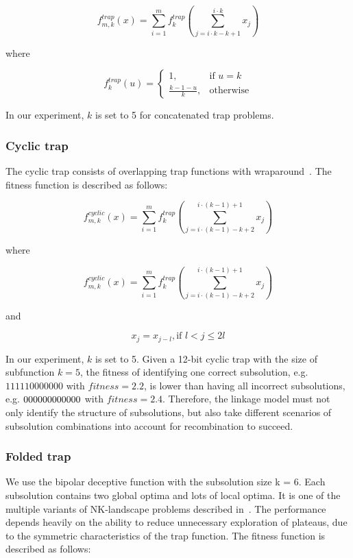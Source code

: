 \documentclass{sig-alternate-05-2015}
\begin{document}
\begin{displaymath}
f_{m,k}^{trap}(x) = \sum_{i=1}^{m} f_{k}^{trap} \left (\sum_{j = i\cdot k-k+1}^{i\cdot k} x_j\right )
\end{displaymath}

where

\begin{displaymath}
f_{k}^{trap}(u) = 
   \begin{cases}
    1, & \text{if $u=k$} \\
    \frac{k-1-u}{k}, & \text{otherwise}
	\end{cases}
\end{displaymath}

In our experiment, $k$ is set to 5 for concatenated trap problems.


\subsubsection{Cyclic trap}
The cyclic trap consists of overlapping trap functions with wraparound~\cite{yu:overlapping}. The fitness function is described as follows:

\begin{displaymath}
f_{m,k}^{cyclic}(x) = \sum_{i=1}^{m} f_{k}^{trap} \left (\sum_{j = i\cdot(k-1)-k+2}^{i\cdot(k-1)+1} x_j\right )
\end{displaymath}

where

\begin{displaymath}
f_{m,k}^{cyclic}(x) = \sum_{i=1}^{m} f_{k}^{trap} \left (\sum_{j = i\cdot(k-1)-k+2}^{i\cdot(k-1)+1} x_j\right )
\end{displaymath}

and

\begin{displaymath}
x_j = x_{j-l}, \text{if } l < j \leq 2l
\end{displaymath}

In our experiment, $k$ is set to 5.
Given a 12-bit cyclic trap with the size of subfunction $k = 5$, the fitness of identifying one correct subsolution, e.g. $111110000000$ with $fitness = 2.2$, is lower than having all incorrect subsolutions, e.g. $00000\\0000000$ with $fitness = 2.4$. Therefore, the linkage model  must not only identify the structure of subsolutions, but also take different scenarios of subsolution combinations into account for recombination to succeed.


\subsubsection{Folded trap}
We use the bipolar deceptive function with the subsolution size k = 6. Each subsolution contains two global optima and lots of local optima. It is one of the multiple variants of NK-landscape problems described in~\cite{goldberg:deception}. The performance depends heavily on the ability to reduce unnecessary exploration of plateaus, due to the symmetric characteristics of the trap function.  The fitness function is described as follows:
\end{document}
